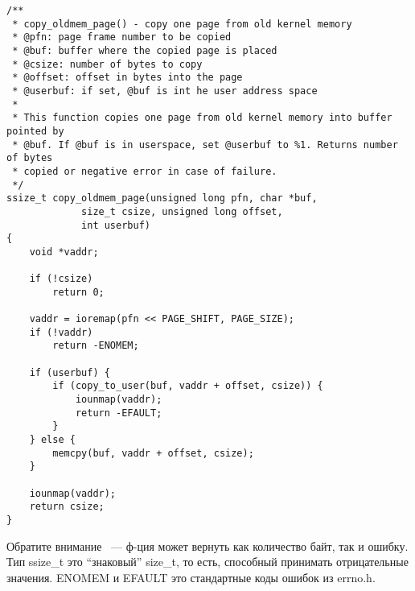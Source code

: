 \begin{lstlisting}[caption=arch/arm/kernel/crash\_dump.c]
/**
 * copy_oldmem_page() - copy one page from old kernel memory
 * @pfn: page frame number to be copied
 * @buf: buffer where the copied page is placed
 * @csize: number of bytes to copy
 * @offset: offset in bytes into the page
 * @userbuf: if set, @buf is int he user address space
 *
 * This function copies one page from old kernel memory into buffer pointed by
 * @buf. If @buf is in userspace, set @userbuf to %1. Returns number of bytes
 * copied or negative error in case of failure.
 */
ssize_t copy_oldmem_page(unsigned long pfn, char *buf,
			 size_t csize, unsigned long offset,
			 int userbuf)
{
	void *vaddr;

	if (!csize)
		return 0;

	vaddr = ioremap(pfn << PAGE_SHIFT, PAGE_SIZE);
	if (!vaddr)
		return -ENOMEM;

	if (userbuf) {
		if (copy_to_user(buf, vaddr + offset, csize)) {
			iounmap(vaddr);
			return -EFAULT;
		}
	} else {
		memcpy(buf, vaddr + offset, csize);
	}

	iounmap(vaddr);
	return csize;
}
\end{lstlisting}

Обратите внимание ~--- ф-ция может вернуть как количество байт, так и ошибку. Тип ssize\_t это ``знаковый'' size\_t,
то есть, способный принимать отрицательные значения. ENOMEM и EFAULT это стандартные коды ошибок из errno.h.

